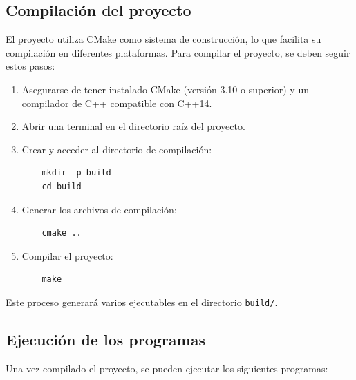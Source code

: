 \documentclass{article}
\begin{document}
\subsection{Compilación del proyecto}

El proyecto utiliza CMake como sistema de construcción, lo que facilita su compilación en diferentes plataformas. Para compilar el proyecto, se deben seguir estos pasos:

\begin{enumerate}
    \item Asegurarse de tener instalado CMake (versión 3.10 o superior) y un compilador de C++ compatible con C++14.
    \item Abrir una terminal en el directorio raíz del proyecto.
    \item Crear y acceder al directorio de compilación:
    \begin{verbatim}
    mkdir -p build
    cd build
    \end{verbatim}
    \item Generar los archivos de compilación:
    \begin{verbatim}
    cmake ..
    \end{verbatim}
    \item Compilar el proyecto:
    \begin{verbatim}
    make
    \end{verbatim}
\end{enumerate}

Este proceso generará varios ejecutables en el directorio \texttt{build/}.

\subsection{Ejecución de los programas}

Una vez compilado el proyecto, se pueden ejecutar los siguientes programas:
\end{document}

